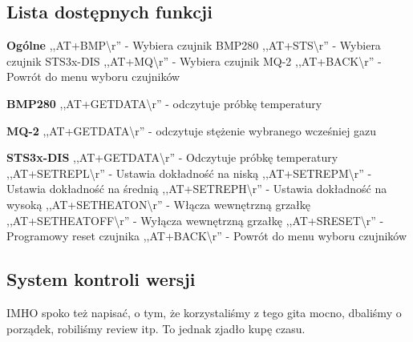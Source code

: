 \subsection{Lista dostępnych funkcji}
\textbf{Ogólne}\newline
   ,,AT+BMP\textbackslash r'' - Wybiera czujnik BMP280\newline
   ,,AT+STS\textbackslash r'' - Wybiera czujnik STS3x-DIS\newline
   ,,AT+MQ\textbackslash r'' - Wybiera czujnik MQ-2\newline
   ,,AT+BACK\textbackslash r'' - Powrót do menu wyboru czujników\newline

\textbf{BMP280}\newline
   ,,AT+GETDATA\textbackslash r'' - odczytuje próbkę temperatury

\textbf{MQ-2}\newline
   ,,AT+GETDATA\textbackslash r'' - odczytuje stężenie wybranego wcześniej gazu

\textbf{STS3x-DIS}\newline
   ,,AT+GETDATA\textbackslash r'' - Odczytuje próbkę temperatury\newline
   ,,AT+SETREPL\textbackslash r'' - Ustawia dokładność na niską \newline
   ,,AT+SETREPM\textbackslash r'' - Ustawia dokładność na średnią\newline
   ,,AT+SETREPH\textbackslash r'' - Ustawia dokładność na wysoką\newline
   ,,AT+SETHEATON\textbackslash r'' - Włącza wewnętrzną grzałkę\newline
   ,,AT+SETHEATOFF\textbackslash r'' - Wyłącza wewnętrzną grzałkę\newline
   ,,AT+SRESET\textbackslash r'' - Programowy reset czujnika\newline
   ,,AT+BACK\textbackslash r'' - Powrót do menu wyboru czujników\newline

\subsection{System kontroli wersji}
IMHO spoko też napisać, o tym, że korzystaliśmy z tego gita mocno, dbaliśmy o porządek, robiliśmy review itp. To jednak zjadło kupę czasu.
